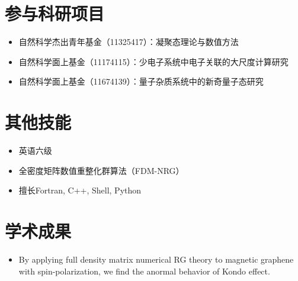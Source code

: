 \documentclass{resume}
\begin{document}
\section{参与科研项目}
\begin{itemize}
\item 自然科学杰出青年基金（11325417）：凝聚态理论与数值方法
\item 自然科学面上基金（11174115）：少电子系统中电子关联的大尺度计算研究
\item 自然科学面上基金（11674139）：量子杂质系统中的新奇量子态研究
\end{itemize}

\section{其他技能}
\begin{itemize}[parsep=0.5ex]
\item 英语六级
\item 全密度矩阵数值重整化群算法（FDM-NRG）
\item 擅长Fortran, C++, Shell, Python
\end{itemize}

\section{学术成果}
\begin{itemize}[parsep=0.5ex]
\item By applying full density matrix numerical RG theory to magnetic graphene with
  spin-polarization, we find the anormal behavior of Kondo effect.
\end{itemize}


%  
\end{document}
